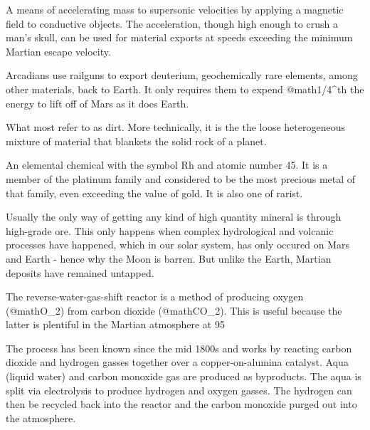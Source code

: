 {%
A means of accelerating mass to supersonic velocities by applying a magnetic field to conductive objects. The acceleration, though high enough to crush a man's skull, can be used for material exports at speeds exceeding the minimum Martian escape velocity.

Arcadians use railguns to export deuterium, geochemically rare elements, among other materials, back to Earth. It only requires them to expend @math{{1/4}^{th}} the energy to lift off of Mars as it does Earth.

What most refer to as dirt. More technically, it is the the loose heterogeneous mixture of material that blankets the solid rock of a planet.

An elemental chemical with the symbol Rh and atomic number 45. It is a member of the platinum family and considered to be the most precious metal of that family, even exceeding the value of gold. It is also one of rarist. 

Usually the only way of getting any kind of high quantity mineral is through high-grade ore. This only happens when complex hydrological and volcanic processes have happened, which in our solar system, has only occured on Mars and Earth - hence why the Moon is barren. But unlike the Earth, Martian deposits have remained untapped.

The reverse-water-gas-shift reactor is a method of producing oxygen (@math{O_2}) from carbon dioxide (@math{CO_2}). This is useful because the latter is plentiful in the Martian atmosphere at 95 %



The process has been known since the mid 1800s and works by reacting carbon dioxide and hydrogen gasses together over a copper-on-alumina catalyst. Aqua (liquid water) and carbon monoxide gas are produced as byproducts. The aqua is split via electrolysis to produce hydrogen and oxygen gasses. The hydrogen can then be recycled back into the reactor and the carbon monoxide purged out into the atmosphere.


}
